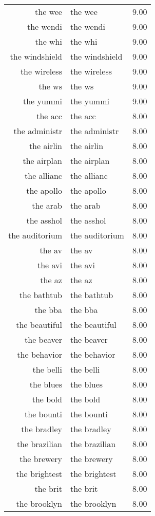 \begin{table}[ht]
\begin{tabular}{rlr}
  the wee & the wee & 9.00 \\ 
  the wendi & the wendi & 9.00 \\ 
  the whi & the whi & 9.00 \\ 
  the windshield & the windshield & 9.00 \\ 
  the wireless & the wireless & 9.00 \\ 
  the ws & the ws & 9.00 \\ 
  the yummi & the yummi & 9.00 \\ 
  the acc & the acc & 8.00 \\ 
  the administr & the administr & 8.00 \\ 
  the airlin & the airlin & 8.00 \\ 
  the airplan & the airplan & 8.00 \\ 
  the allianc & the allianc & 8.00 \\ 
  the apollo & the apollo & 8.00 \\ 
  the arab & the arab & 8.00 \\ 
  the asshol & the asshol & 8.00 \\ 
  the auditorium & the auditorium & 8.00 \\ 
  the av & the av & 8.00 \\ 
  the avi & the avi & 8.00 \\ 
  the az & the az & 8.00 \\ 
  the bathtub & the bathtub & 8.00 \\ 
  the bba & the bba & 8.00 \\ 
  the beautiful & the beautiful & 8.00 \\ 
  the beaver & the beaver & 8.00 \\ 
  the behavior & the behavior & 8.00 \\ 
  the belli & the belli & 8.00 \\ 
  the blues & the blues & 8.00 \\ 
  the bold & the bold & 8.00 \\ 
  the bounti & the bounti & 8.00 \\ 
  the bradley & the bradley & 8.00 \\ 
  the brazilian & the brazilian & 8.00 \\ 
  the brewery & the brewery & 8.00 \\ 
  the brightest & the brightest & 8.00 \\ 
  the brit & the brit & 8.00 \\ 
  the brooklyn & the brooklyn & 8.00 \\ 

\end{tabular}
\end{table}
